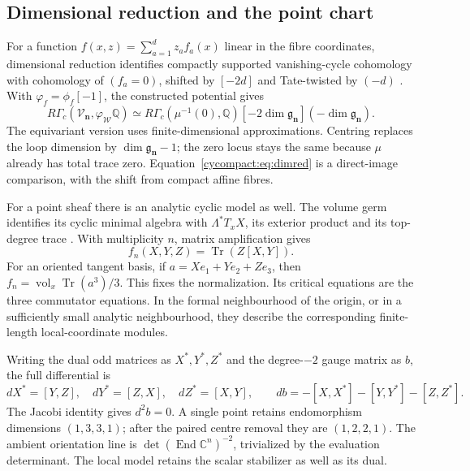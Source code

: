 \subsection{Dimensional reduction and the point chart}

For a function $f(x,z)=\sum_{a=1}^d z_af_a(x)$ linear in
the fibre coordinates, dimensional reduction identifies
compactly supported vanishing-cycle cohomology with
cohomology of $(f_a=0)$, shifted by $[-2d]$ and
Tate-twisted by $(-d)$ \cite[Appendix A]{DavisonCriticalCoHA}.
With $\varphi_f=\phi_f[-1]$, the constructed potential gives
\begin{equation}\label{cycompact:eq:dimred}
 R\Gamma_c(\mathcal V_{\mathbf n},\varphi_{\mathcal W}\mathbb Q)
 \simeq R\Gamma_c(\mu^{-1}(0),\mathbb Q)
       [-2\dim\mathfrak g_{\mathbf n}](-\dim\mathfrak g_{\mathbf n}).
\end{equation}
The equivariant version uses finite-dimensional
approximations. Centring replaces the loop dimension by
$\dim\mathfrak g_{\mathbf n}-1$; the zero locus stays the
same because $\mu$ already has total trace zero.
Equation~\eqref{cycompact:eq:dimred} is a direct-image
comparison, with the shift from compact affine fibres.

For a point sheaf there is an analytic cyclic model as
well. The volume germ identifies its cyclic minimal
algebra with $\Lambda^*T_xX$, its exterior product and
its top-degree trace \cite{cycompact:VanGarderen}.
With multiplicity $n$, matrix amplification gives
\begin{equation}\label{cycompact:eq:point-potential}
 f_n(X,Y,Z)=\operatorname{Tr}(Z[X,Y]).
\end{equation}
For an oriented tangent basis, if $a=Xe_1+Ye_2+Ze_3$,
then $f_n=\operatorname{vol}_x\operatorname{Tr}(a^3)/3$.
This fixes the normalization. Its critical equations
are the three commutator equations. In the formal
neighbourhood of the origin, or in a sufficiently small
analytic neighbourhood, they describe the corresponding
finite-length local-coordinate modules.

Writing the dual odd matrices as $X^*,Y^*,Z^*$ and the
degree-$-2$ gauge matrix as $b$, the full differential is
\[
 dX^*=[Y,Z],\quad dY^*=[Z,X],\quad dZ^*=[X,Y],\qquad
 db=-[X,X^*]-[Y,Y^*]-[Z,Z^*].
\]
The Jacobi identity gives $d^2b=0$. A single point retains
endomorphism dimensions $(1,3,3,1)$; after the paired
centre removal they are $(1,2,2,1)$.
The ambient orientation line is
$\det(\operatorname{End}\mathbb C^n)^{-2}$, trivialized by
the evaluation determinant. The local model retains the
scalar stabilizer as well as its dual.

